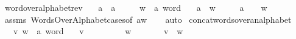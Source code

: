 \begin{isabellebody}
\isanewline
{}\isamarkupfalse%
\ word{\isacharunderscore}{\kern0pt}over{\isacharunderscore}{\kern0pt}alphabet{\isacharunderscore}{\kern0pt}rev{\isacharcolon}{\kern0pt}\isanewline
\ \ \ a\ {\isacharcolon}{\kern0pt}{\isacharcolon}{\kern0pt}\ {\isachardoublequoteopen}{\isacharprime}{\kern0pt}a{\isachardoublequoteclose}\isanewline
\ \ \ \ \ w\ {\isacharcolon}{\kern0pt}{\isacharcolon}{\kern0pt}\ {\isachardoublequoteopen}{\isacharprime}{\kern0pt}a\ word{\isachardoublequoteclose}\isanewline
\ \ \ {\isachardoublequoteopen}{\isacharparenleft}{\kern0pt}{\isacharbrackleft}{\kern0pt}a{\isacharbrackright}{\kern0pt}\ {\isasymsqdot}\ w{\isacharparenright}{\kern0pt}\ {\isasymin}\ {\isasymSigma}\isactrlsup {\isacharasterisk}{\kern0pt}{\isachardoublequoteclose}\isanewline
\ \ \ {\isachardoublequoteopen}a\ {\isasymin}\ {\isasymSigma}{\isachardoublequoteclose}\ \ {\isachardoublequoteopen}w\ {\isasymin}\ {\isasymSigma}\isactrlsup {\isacharasterisk}{\kern0pt}{\isachardoublequoteclose}\isanewline
%
\isadelimproof
\ \ %
\endisadelimproof
%
\isatagproof
{}\isamarkupfalse%
\ assms\ WordsOverAlphabet{\isachardot}{\kern0pt}cases{\isacharbrackleft}{\kern0pt}of\ {\isachardoublequoteopen}a{\isacharhash}{\kern0pt}w{\isachardoublequoteclose}{\isacharbrackright}{\kern0pt}\isanewline
\ \ \isamarkupfalse%
\ auto%
\endisatagproof
{\isafoldproof}%
%
\isadelimproof
\isanewline
%
\endisadelimproof
\isanewline
{}\isamarkupfalse%
\ concat{\isacharunderscore}{\kern0pt}words{\isacharunderscore}{\kern0pt}over{\isacharunderscore}{\kern0pt}an{\isacharunderscore}{\kern0pt}alphabet{\isacharcolon}{\kern0pt}\isanewline
\ \ \ v\ w\ {\isacharcolon}{\kern0pt}{\isacharcolon}{\kern0pt}\ {\isachardoublequoteopen}{\isacharprime}{\kern0pt}a\ word{\isachardoublequoteclose}\isanewline
\ \ \ {\isachardoublequoteopen}v\ {\isasymin}\ {\isasymSigma}\isactrlsup {\isacharasterisk}{\kern0pt}{\isachardoublequoteclose}\isanewline
\ \ \ \ \ \ \ {\isachardoublequoteopen}w\ {\isasymin}\ {\isasymSigma}\isactrlsup {\isacharasterisk}{\kern0pt}{\isachardoublequoteclose}\isanewline
\ \ \ \ \ {\isachardoublequoteopen}{\isacharparenleft}{\kern0pt}v\ {\isasymsqdot}\ w{\isacharparenright}{\kern0pt}\ {\isasymin}\ {\isasymSigma}\isactrlsup {\isacharasterisk}{\kern0pt}{\isachardoublequoteclose}\isanewline
%
\isadelimproof
\ \ %
\endisadelimproof
%
\isatagproof
{}\isamarkupfalse%

\end{isabellebody}
